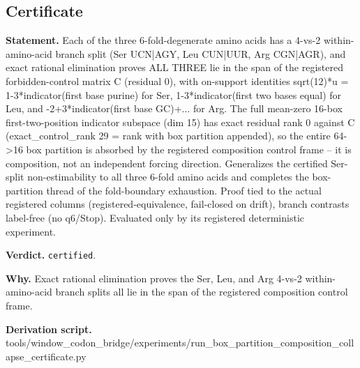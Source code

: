 \subsection{Certificate}\label{sec:bridge-certificate}
\textbf{Statement.} Each of the three 6-fold-degenerate amino acids has a 4-vs-2 within-amino-acid branch split (Ser
UCN|AGY, Leu CUN|UUR, Arg CGN|AGR), and exact rational elimination proves ALL THREE lie in the span
of the registered forbidden-control matrix C (residual 0), with on-support identities sqrt(12)*u =
1-3*indicator(first base purine) for Ser, 1-3*indicator(first two bases equal) for Leu, and
-2+3*indicator(first base GC)+... for Arg. The full mean-zero 16-box first-two-position indicator
subspace (dim 15) has exact residual rank 0 against C (exact\_control\_rank 29 = rank with box
partition appended), so the entire 64->16 box partition is absorbed by the registered composition
control frame -- it is composition, not an independent forcing direction. Generalizes the certified
Ser-split non-estimability to all three 6-fold amino acids and completes the box-partition thread of
the fold-boundary exhaustion. Proof tied to the actual registered columns (registered-equivalence,
fail-closed on drift), branch contrasts label-free (no q6/Stop). Evaluated only by its registered
deterministic experiment.

\textbf{Verdict.} \texttt{certified}.

\textbf{Why.} Exact rational elimination proves the Ser, Leu, and Arg 4-vs-2 within-amino-acid branch splits all
lie in the span of the registered composition control frame.

\textbf{Derivation script.} tools/window\_codon\_bridge/experiments/run\_box\_partition\_composition\_collapse\_certificate.py

